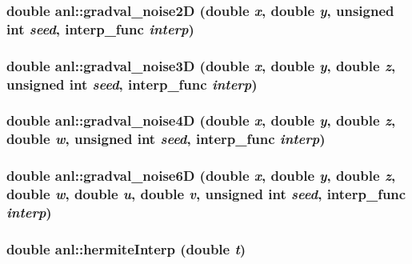 \label{namespaceanl_ac98904b69077be4f5b3719ec1f564019}
\hypertarget{namespaceanl_a27be7e27fc1d1e8b8b4366652bec4420}{
\subsubsection[{gradval\_\-noise2D}]{\setlength{\rightskip}{0pt plus 5cm}double anl::gradval\_\-noise2D (double {\em x}, \/  double {\em y}, \/  unsigned int {\em seed}, \/  interp\_\-func {\em interp})}}
\label{namespaceanl_a27be7e27fc1d1e8b8b4366652bec4420}
\hypertarget{namespaceanl_a218cc7d19c11589f3fb6a7eb10614f8a}{
\subsubsection[{gradval\_\-noise3D}]{\setlength{\rightskip}{0pt plus 5cm}double anl::gradval\_\-noise3D (double {\em x}, \/  double {\em y}, \/  double {\em z}, \/  unsigned int {\em seed}, \/  interp\_\-func {\em interp})}}
\label{namespaceanl_a218cc7d19c11589f3fb6a7eb10614f8a}
\hypertarget{namespaceanl_ab001aaabd4e3d5bb17f92528d19af695}{
\subsubsection[{gradval\_\-noise4D}]{\setlength{\rightskip}{0pt plus 5cm}double anl::gradval\_\-noise4D (double {\em x}, \/  double {\em y}, \/  double {\em z}, \/  double {\em w}, \/  unsigned int {\em seed}, \/  interp\_\-func {\em interp})}}
\label{namespaceanl_ab001aaabd4e3d5bb17f92528d19af695}
\hypertarget{namespaceanl_a4dbfce5cf887da55b7cbb455ec6bf1d4}{
\subsubsection[{gradval\_\-noise6D}]{\setlength{\rightskip}{0pt plus 5cm}double anl::gradval\_\-noise6D (double {\em x}, \/  double {\em y}, \/  double {\em z}, \/  double {\em w}, \/  double {\em u}, \/  double {\em v}, \/  unsigned int {\em seed}, \/  interp\_\-func {\em interp})}}
\label{namespaceanl_a4dbfce5cf887da55b7cbb455ec6bf1d4}
\hypertarget{namespaceanl_a6251423b45b56c17ffa27b6ee9d3a252}{
\subsubsection[{hermiteInterp}]{\setlength{\rightskip}{0pt plus 5cm}double anl::hermiteInterp (double {\em t})}}
